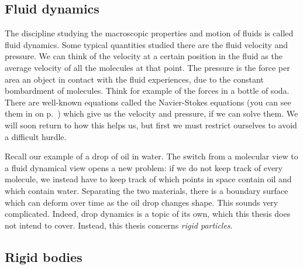 \documentclass[thesis.tex]{subfiles}
\begin{document}

\subsection*{Fluid dynamics}

The discipline studying the macroscopic properties and motion of fluids is called fluid dynamics. Some typical quantities studied there are the fluid velocity and pressure. We can think of the velocity at a certain position in the fluid as the average velocity of all the molecules at that point. The pressure is the force per area an object in contact with the fluid experiences, due to the constant bombardment of molecules. Think for example of the forces in a bottle of soda. There are well-known equations called the Navier-Stokes equations (you can see them in  on p.~\pageref{eqn:navierstokes}) which give us the velocity and pressure, if we can solve them. We will soon return to how this helps us, but first we must restrict ourselves to avoid a difficult hurdle.

Recall our example of a drop of oil in water. The switch from a molecular view to a fluid dynamical view opens a new problem: if we do not keep track of every molecule, we instead have to keep track of which points in space contain oil and which contain water. Separating the two materials, there is a boundary surface which can deform over time as the oil drop changes shape. This sounds very complicated. Indeed, drop dynamics is a topic of its own, which this thesis does not intend to cover. Instead, this thesis concerns \emph{rigid particles}. 

\subsection*{Rigid bodies}
\end{document}
